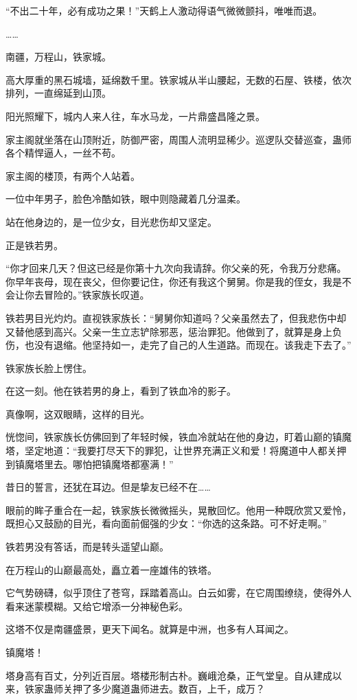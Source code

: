 \begin{this_body}
“不出二十年，必有成功之果！”天鹤上人激动得语气微微颤抖，唯唯而退。

……

南疆，万程山，铁家城。

高大厚重的黑石城墙，延绵数千里。铁家城从半山腰起，无数的石屋、铁楼，依次排列，一直绵延到山顶。

阳光照耀下，城内人来人往，车水马龙，一片鼎盛昌隆之景。

家主阁就坐落在山顶附近，防御严密，周围人流明显稀少。巡逻队交替巡查，蛊师各个精悍逼人，一丝不苟。

家主阁的楼顶，有两个人站着。

一位中年男子，脸色冷酷如铁，眼中则隐藏着几分温柔。

站在他身边的，是一位少女，目光悲伤却又坚定。

正是铁若男。

“你才回来几天？但这已经是你第十九次向我请辞。你父亲的死，令我万分悲痛。你早年丧母，现在丧父，但你要记住，你还有我这个舅舅。你是我的侄女，我是不会让你去冒险的。”铁家族长叹道。

铁若男目光灼灼。直视铁家族长：“舅舅你知道吗？父亲虽然去了，但我悲伤中却又替他感到高兴。父亲一生立志铲除邪恶，惩治罪犯。他做到了，就算是身上负伤，也没有退缩。他坚持如一，走完了自己的人生道路。而现在。该我走下去了。”

铁家族长脸上愣住。

在这一刻。他在铁若男的身上，看到了铁血冷的影子。

真像啊，这双眼睛，这样的目光。

恍惚间，铁家族长仿佛回到了年轻时候，铁血冷就站在他的身边，盯着山巅的镇魔塔，坚定地道：“我要打尽天下的罪犯，让世界充满正义和爱！将魔道中人都关押到镇魔塔里去。哪怕把镇魔塔都塞满！”

昔日的誓言，还犹在耳边。但是挚友已经不在……

眼前的眸子重合在一起，铁家族长微微摇头，晃散回忆。他用一种既欣赏又爱怜，既担心又鼓励的目光，看向面前倔强的少女：“你选的这条路。可不好走啊。”

铁若男没有答话，而是转头遥望山巅。

在万程山的山巅最高处，矗立着一座雄伟的铁塔。

它气势磅礴，似乎顶住了苍穹，踩踏着高山。白云如雾，在它周围缭绕，使得外人看来迷蒙模糊。又给它增添一分神秘色彩。

这塔不仅是南疆盛景，更天下闻名。就算是中洲，也多有人耳闻之。

镇魔塔！

塔身高有百丈，分列近百层。塔楼形制古朴。巍峨沧桑，正气堂皇。自从建成以来，铁家蛊师关押了多少魔道蛊师进去。数百，上千，成万？


\end{this_body}
